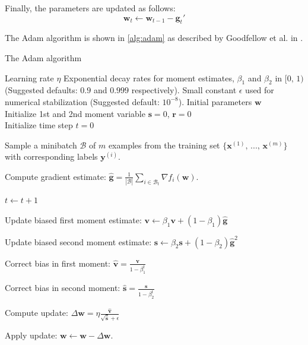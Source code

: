 Finally, the parameters are updated as follows:
\begin{equation}
    \textbf{w}_t \leftarrow \textbf{w}_{t-1} - \mathbf{g}_t'
\end{equation}

The Adam algorithm is shown in \autoref{alg:adam} as described by Goodfellow et al. in \cite{Goodfellow-et-al-2016}.

\begin{algorithm}
    \caption{The Adam algorithm}\label{alg:adam}
    \begin{algorithmic}
        \Require Learning rate $\eta$
        \Require Exponential decay rates for moment estimates, $\beta_1$ and $\beta_2$ in $[0, \, 1)$ (Suggested defaults: $0.9$ and $0.999$ respectively).
        \Require Small constant $\epsilon$ used for numerical stabilization (Suggested default: $10^{-8}$).
        \Require Initial parameters $\textbf{w}$\\
        Initialize 1st and 2nd moment variable $\mathbf{s} = 0$, $\mathbf{r} = 0$\\
        Initialize time step $t = 0$
        
        Sample a minibatch $\mathcal{B}$ of $m$ examples from the training set $\{ \textbf{x}^{(1)},\, ..., \, \textbf{x}^{(m)}\}$ with corresponding labels $\textbf{y}^{(i)}$.
        
        Compute gradient estimate: $\hat{\mathbf{g}} = \frac{1}{|\mathcal{B}|} \sum_{i \in \mathcal{B}_t} \nabla f_i(\mathbf{w})$.

        $t \leftarrow t +1$
        
        Update biased first moment estimate: $\mathbf{v} \leftarrow \beta_1 \mathbf{v} + (1 - \beta_1) \mathbf{\hat{g}}$

        Update biased second moment estimate: $\mathbf{s} \leftarrow \beta_2 \mathbf{s} + (1 - \beta_2) \mathbf{\hat{g}}^2$

        Correct bias in first moment: $\hat{\mathbf{v}} = \frac{\mathbf{v}}{1 - \beta_1^t}$
  
        Correct bias in second moment: $\hat{\mathbf{s}} = \frac{\mathbf{s}}{1 - \beta_2^t}$

        Compute update: $\Delta \mathbf{w} = \eta \frac{ \hat{\mathbf{v}}}{\sqrt{\hat{\mathbf{s}}} + \epsilon}$

        Apply update: $\textbf{w} \leftarrow \textbf{w} - \Delta \mathbf{w}$.

    \EndWhile
    \end{algorithmic}
    \end{algorithm}

